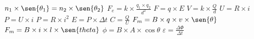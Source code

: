  $n_1 \times \sen{\theta_1} = n_2 \times \sen{\theta_2}$
 $F_e=k\times \frac{q_1\times q_2}{d^2}$
 $F = q \times E$
 $V=k\times \frac{Q}{d}$
 $U = R \times i$
 $P = U \times i$
 $P = R \times i^2$
 $E = P \times \Delta t$
 $C =\frac{Q}{U}$
 $F_m= B \times  q  \times v \times \sen{\theta}$
 $F_m= B \times i \times l \times \sen{theta}$
 $\phi = B \times A \times \cos{\theta}$
 $\varepsilon = \frac{\Delta \Phi}{\Delta t}$
 
